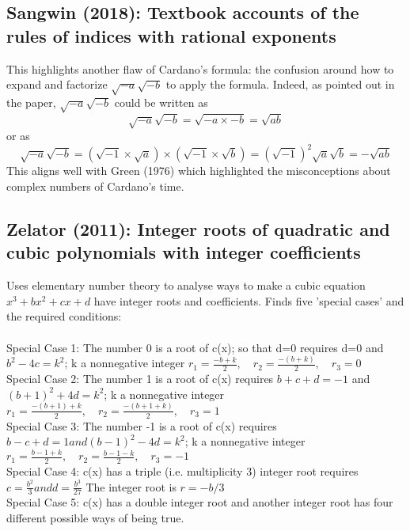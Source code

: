 \documentclass[12pt]{article}
\begin{document}
\subsection{Sangwin (2018): Textbook accounts of the rules of indices with rational exponents}
This highlights another flaw of Cardano's formula: the confusion around how to expand and factorize $\sqrt{-a} \sqrt{-b}$ to apply the formula. Indeed, as pointed out in the paper, $\sqrt{-a} \sqrt{-b}$ could be written as
\[\sqrt{-a} \sqrt{-b} = \sqrt{-a \times -b} = \sqrt{ab} \]
or as
\[\sqrt{-a} \sqrt{-b} = (\sqrt{-1} \times \sqrt{a}) \times (\sqrt{-1} \times \sqrt{b}) = (\sqrt{-1})^2 \sqrt{a} \sqrt{b} = -\sqrt{ab} \]
This aligns well with Green (1976) which highlighted the misconceptions about complex numbers of Cardano's time.

\subsection{Zelator (2011): Integer roots of quadratic and cubic polynomials with integer coefficients}
Uses elementary number theory to analyse ways to make a cubic equation $x^3 + bx^2 + cx + d$ have integer roots and coefficients. Finds five 'special cases' and the required conditions:\\\\

Special Case 1: The number 0 is a root of c(x); so that d=0 requires d=0 and $b^2-4c=k^2$; k a nonnegative integer $r_1 = \frac{-b + k}{2}, \quad r_2 = \frac{-(b + k)}{2}, \quad r_3 = 0$\\

Special Case 2: The number 1 is a root of c(x) requires $b+c+d=-1$ and $(b+1)^2+4d = k^2$; k a nonnegative integer $r_1 = \frac{-(b + 1) + k}{2}, \quad r_2 = \frac{-(b + 1 + k)}{2}, \quad r_3 = 1$\\

Special Case 3: The number -1 is a root of c(x) requires $b-c+d=1 and (b-1)^2-4d=k^2$; k a nonnegative integer $r_1 = \frac{b - 1 + k}{2}, \quad r_2 = \frac{b - 1 - k}{2}, \quad r_3 = -1$\\

Special Case 4: c(x) has a triple (i.e. multiplicity 3) integer root requires $c=\frac{b^2}{3} and d= \frac{b^3}{27}$ The integer root is $r=-b/3$\\

Special Case 5: c(x) has a double integer root and another integer root has four different possible ways of being true.
\end{document}
